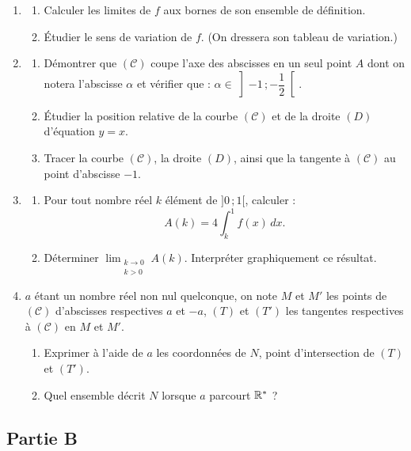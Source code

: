 \begin{enumerate}
	\item
	\begin{enumerate}
		\item Calculer les limites de $f$ aux bornes de son ensemble de définition.
		\item Étudier le sens de variation de $f$. (On dressera son tableau de variation.)
	\end{enumerate}

	\item
	\begin{enumerate}
		\item Démontrer que $(\mathscr{C})$ coupe l'axe des abscisses en un seul point $A$ dont on notera l'abscisse $\alpha$ et vérifier que : $\alpha \in \left]-1\,;-\dfrac{1}{2}\right[$.
		\item Étudier la position relative de la courbe $(\mathscr{C})$ et de la droite $(D)$ d'équation $y = x$.
		\item Tracer la courbe $(\mathscr{C})$, la droite $(D)$, ainsi que la tangente à $(\mathscr{C})$ au point d'abscisse $-1$.
	\end{enumerate}

	\item
	\begin{enumerate}
		\item Pour tout nombre réel $k$ élément de $]0\,;1[$, calculer :
		$$
		A(k) = 4\int_k^1 f(x)\,dx.
		$$
		\item Déterminer $\displaystyle\lim_{\substack{k\to0\\k>0}} A(k)$. Interpréter graphiquement ce résultat.
	\end{enumerate}

	\item $a$ étant un nombre réel non nul quelconque, on note $M$ et $M'$ les points de $(\mathscr{C})$ d'abscisses respectives $a$ et $-a$, $(T)$ et $(T')$ les tangentes respectives à $(\mathscr{C})$ en $M$ et $M'$.
	\begin{enumerate}
		\item Exprimer à l'aide de $a$ les coordonnées de $N$, point d'intersection de $(T)$ et $(T')$.
		\item Quel ensemble décrit $N$ lorsque $a$ parcourt $\mathbb{R}^*$ ?
	\end{enumerate}
\end{enumerate}

\subsection*{Partie B}


